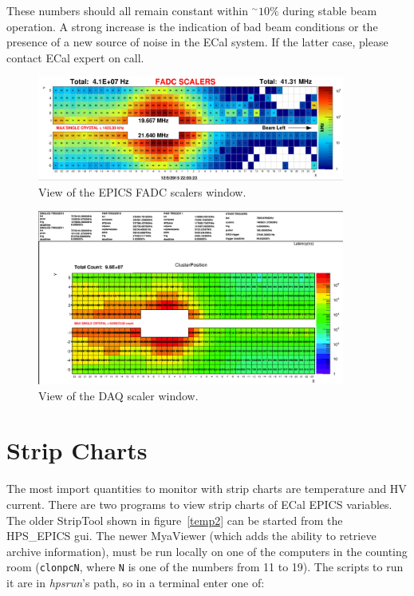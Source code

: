 \documentclass[12pt]{article}
\begin{document}
      These numbers should all remain constant within $^\sim10\%$ during stable beam operation. A strong increase is the indication of bad beam conditions or the presence of a new source of noise in the ECal system.  If the latter case, please contact ECal expert on call.
\begin{figure}[htbp]
\center
\includegraphics[width=0.9\textwidth]{pics/fadcscalers_2015run.png}
\caption{ \label{Scalers} View of the EPICS FADC scalers window.}
\end{figure}
\begin{figure}[htbp]
\center
\includegraphics[width=0.9\textwidth]{pics/ecal-cluster-12-20-14.png}
\caption{ \label{DAQscalers} View of the DAQ scaler window.}
\end{figure}

\newpage
  \section{Strip Charts}
      The most import quantities to monitor with strip charts are temperature and HV current.  There are two programs to view strip charts of ECal EPICS variables.  The older StripTool shown in figure~\ref{temp2} can be started from the HPS\_EPICS gui.  The newer MyaViewer (which adds the ability to retrieve archive information), must be run locally on one of the computers in the counting room (\texttt{clonpcN}, where \texttt{N} is one of the numbers from 11 to 19).  The scripts to run it are in {\it hpsrun}'s path, so in a terminal enter one of:
      
\end{document}
